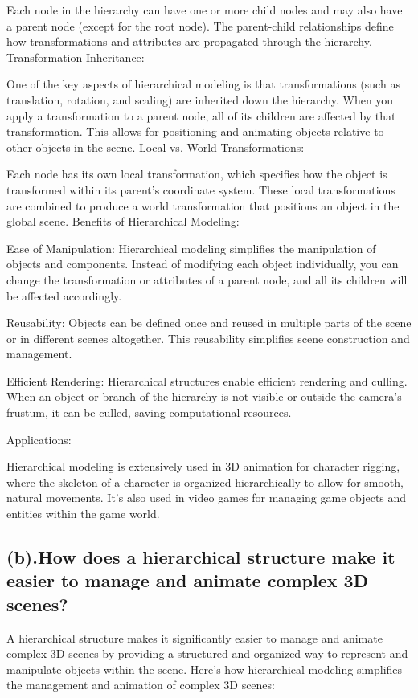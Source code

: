 \documentclass{article}
\begin{document}
\begin{itemize}
Each node in the hierarchy can have one or more child nodes and may also have a parent node (except for the root node). The parent-child relationships define how transformations and attributes are propagated through the hierarchy.
Transformation Inheritance:

One of the key aspects of hierarchical modeling is that transformations (such as translation, rotation, and scaling) are inherited down the hierarchy. When you apply a transformation to a parent node, all of its children are affected by that transformation. This allows for positioning and animating objects relative to other objects in the scene.
Local vs. World Transformations:

Each node has its own local transformation, which specifies how the object is transformed within its parent's coordinate system. These local transformations are combined to produce a world transformation that positions an object in the global scene.
Benefits of Hierarchical Modeling:

Ease of Manipulation: Hierarchical modeling simplifies the manipulation of objects and components. Instead of modifying each object individually, you can change the transformation or attributes of a parent node, and all its children will be affected accordingly.

Reusability: Objects can be defined once and reused in multiple parts of the scene or in different scenes altogether. This reusability simplifies scene construction and management.

Efficient Rendering: Hierarchical structures enable efficient rendering and culling. When an object or branch of the hierarchy is not visible or outside the camera's frustum, it can be culled, saving computational resources.

Applications:

Hierarchical modeling is extensively used in 3D animation for character rigging, where the skeleton of a character is organized hierarchically to allow for smooth, natural movements. It's also used in video games for managing game objects and entities within the game world.
\subsection{(b).How does a hierarchical structure make it easier to manage and animate complex 3D scenes?}
A hierarchical structure makes it significantly easier to manage and animate complex 3D scenes by providing a structured and organized way to represent and manipulate objects within the scene. Here's how hierarchical modeling simplifies the management and animation of complex 3D scenes:


\end{itemize}
\end{document}
